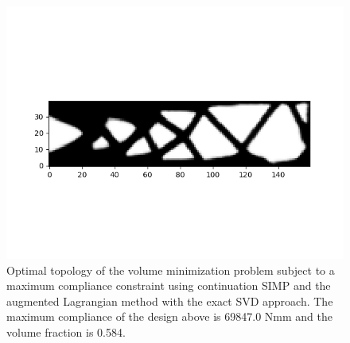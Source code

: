       \begin{figure}
        \centering
        \includegraphics[width=\textwidth]{./images/robust_exact/exact_svd_max_csimp.png}
        \caption{Optimal topology of the volume minimization problem subject to a maximum compliance constraint using continuation SIMP and the augmented Lagrangian method with the exact SVD approach. The maximum compliance of the design above is 69847.0 Nmm and the volume fraction is 0.584.}
        \label{fig:max}
      \end{figure}

